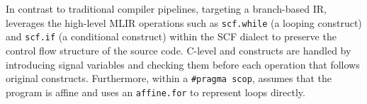 In contrast to traditional compiler pipelines, targeting a branch-based IR, \tool leverages the high-level MLIR operations such as \texttt{scf.while} (a looping construct) and \texttt{scf.if} (a conditional construct) within the SCF dialect to preserve the control flow structure of the source code. C-level  and  constructs are handled by introducing signal
variables and checking them before each operation that follows original constructs. Furthermore, within a \texttt{\#pragma scop}, \tool assumes that the program is affine and uses an \texttt{affine.for} to represent loops directly.



